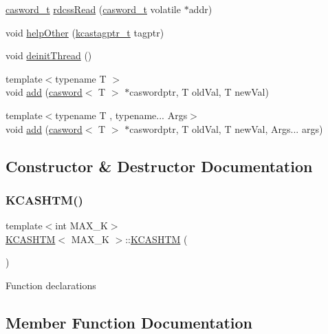 \begin{DoxyCompactItemize}
\hyperlink{rq__unsafe_8h_ad45142aaf2ff20a036dc6242b8483e9c}{casword\+\_\+t} \hyperlink{classKCASHTM_accfa276b0532e301dcd245c96a35fc1a}{rdcss\+Read} (\hyperlink{rq__unsafe_8h_ad45142aaf2ff20a036dc6242b8483e9c}{casword\+\_\+t} volatile $\ast$addr)
\item 
void \hyperlink{classKCASHTM_a6a53e2832b8e53b09c3ab147309fe645}{help\+Other} (\hyperlink{kcas__reuse__impl_8h_a22868433cf4300ce32f000ed8c8dd76c}{kcastagptr\+\_\+t} tagptr)
\item 
void \hyperlink{classKCASHTM_a1e8db0d4b5f85d6ebdfcb3615ca901a9}{deinit\+Thread} ()
\item 
{\footnotesize template$<$typename T $>$ }\\void \hyperlink{classKCASHTM_a43369d50f3fdc91a32f9d248a59d87e5}{add} (\hyperlink{structcasword}{casword}$<$ T $>$ $\ast$caswordptr, T old\+Val, T new\+Val)
\item 
{\footnotesize template$<$typename T , typename... Args$>$ }\\void \hyperlink{classKCASHTM_a4d983dc96331215e5328e2bacc5074e2}{add} (\hyperlink{structcasword}{casword}$<$ T $>$ $\ast$caswordptr, T old\+Val, T new\+Val, Args... args)
\end{DoxyCompactItemize}


\subsection{Constructor \& Destructor Documentation}
\mbox{\label{classKCASHTM_a5c4a7dc01aa24d18bbf2be197adb4536}} 
\subsubsection{\texorpdfstring{K\+C\+A\+S\+H\+T\+M()}{KCASHTM()}}
{\footnotesize\ttfamily template$<$int M\+A\+X\+\_\+K$>$ \\
\hyperlink{classKCASHTM}{K\+C\+A\+S\+H\+TM}$<$ M\+A\+X\+\_\+K $>$\+::\hyperlink{classKCASHTM}{K\+C\+A\+S\+H\+TM} (\begin{DoxyParamCaption}{ }\end{DoxyParamCaption})}

Function declarations 

\subsection{Member Function Documentation}
\mbox{\label{classKCASHTM_a43369d50f3fdc91a32f9d248a59d87e5}} 
